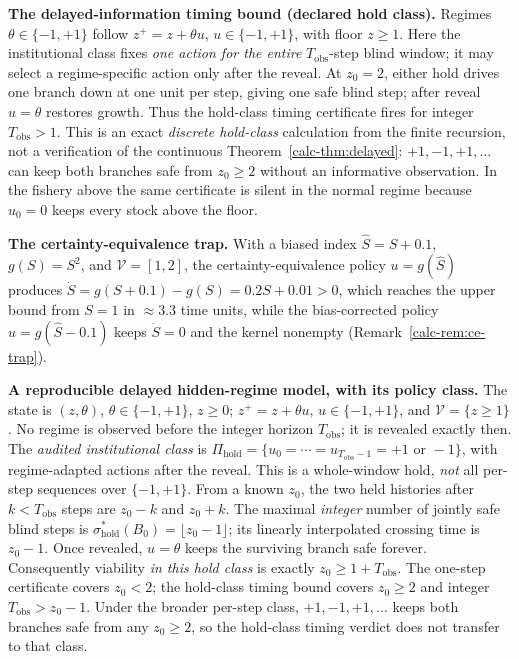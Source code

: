 \documentclass[10pt,twocolumn]{article}
\theoremstyle{definition}
\begin{document}
\textbf{The delayed-information timing bound (declared hold class).}
Regimes \(\theta\in\{-1,+1\}\) follow \(z^{+}=z+\theta u\),
\(u\in\{-1,+1\}\), with floor \(z\ge1\). Here the institutional
class fixes \emph{one action for the entire} \(T_{\mathrm{obs}}\)-step
blind window; it may select a regime-specific action only after the
reveal. At \(z_0=2\), either hold drives one branch down at one unit
per step, giving one safe blind step; after reveal \(u=\theta\)
restores growth. Thus the hold-class timing certificate fires for
integer \(T_{\mathrm{obs}}>1\). This is an exact \emph{discrete hold-class} calculation from the
finite recursion, not a verification of the continuous Theorem~\ref{calc-thm:delayed}: \(+1,-1,+1,\ldots\) can keep both branches safe from
\(z_0\ge2\) without an informative observation. In the fishery above
the same certificate is silent in the normal regime because \(u_0=0\)
keeps every stock above the floor.

\textbf{The certainty-equivalence trap.} With a biased index \(\hat{S} = S + 0.1\), \(g(S) = S^{2}\), and \(\mathcal{V} = [1,2]\), the certainty-equivalence policy \(u = g(\hat{S})\) produces \(\dot{S} = g(S+0.1) - g(S) = 0.2S + 0.01 > 0\), which reaches the upper bound from \(S = 1\) in \(\approx 3.3\) time units, while the bias-corrected policy \(u = g(\hat{S} - 0.1)\) keeps \(\dot{S} = 0\) and the kernel nonempty (Remark~\ref{calc-rem:ce-trap}).

\textbf{A reproducible delayed hidden-regime model, with its policy class.}
The state is \((z,\theta)\), \(\theta\in\{-1,+1\}\), \(z\ge0\);
\(z^{+}=z+\theta u\), \(u\in\{-1,+1\}\), and
\(\mathcal V=\{z\ge1\}\). No regime is observed before the integer
horizon \(T_{\mathrm{obs}}\); it is revealed exactly then. The \emph{audited
institutional class} is
\(\Pi_{\mathrm{hold}}=\{u_0=\cdots=u_{T_{\mathrm{obs}}-1}
=+1\text{ or }-1\}\), with regime-adapted actions after the reveal.
This is a whole-window hold, \emph{not} all per-step sequences over
\(\{-1,+1\}\). From a known \(z_0\), the two held histories after
\(k<T_{\mathrm{obs}}\) steps are \(z_0-k\) and \(z_0+k\).
The maximal \emph{integer} number of jointly safe blind steps is
\(\sigma^*_{\mathrm{hold}}(B_0)=\lfloor z_0-1\rfloor\); its linearly
interpolated crossing time is \(z_0-1\). Once revealed, \(u=\theta\)
keeps the surviving branch safe forever. Consequently viability
\emph{in this hold class} is exactly \(z_0\ge1+T_{\mathrm{obs}}\).
The one-step certificate covers \(z_0<2\); the hold-class timing
bound covers \(z_0\ge2\) and integer
\(T_{\mathrm{obs}}>z_0-1\). Under the broader per-step class,
\(+1,-1,+1,\ldots\) keeps both branches safe from any \(z_0\ge2\),
so the hold-class timing verdict does not transfer to that class.
\end{document}
